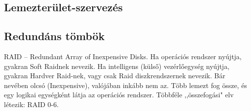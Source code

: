 \documentclass[margin=0px]{article}
\begin{document}
\subsection{Lemezterület-szervezés}

\subsection{Redundáns tömbök}

RAID -- Redundant Array of Inexpensive Disks. Ha operációs rendszer nyújtja, gyakran Soft Raidnek nevezik. Ha intelligens (külső) vezérlőegység nyújtja, gyakran Hardver Raid-nek, vagy csak Raid diszkrendszernek nevezik. Bár nevében olcsó (Inexpensive), valójában inkább nem az. Több lemezt fog össze, és egy logikai egységként látja az operációs rendszer. Többféle ,,összefogási" elv létezik: RAID 0-6.
\end{document}

